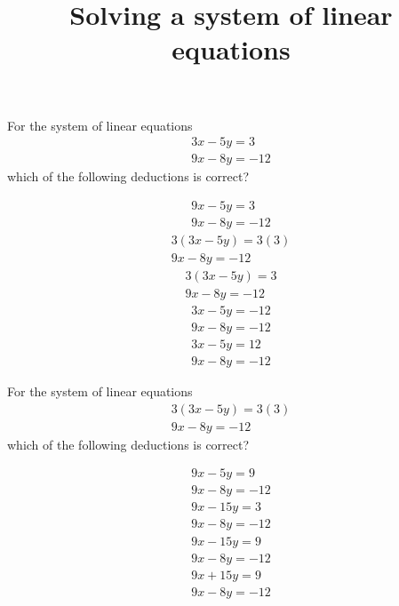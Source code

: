 \documentclass{webquiz}
\title{Solving a system of linear equations}
\begin{document}
\begin{question} %
For the system of linear equations
\begin{gather*} 
3x-5y=3\\
9x-8y=-12
\end{gather*}
which of the following deductions is correct?
\begin{choice}[columns=1] %
\incorrect
\begin{gather*} 
9x-5y=3\\
9x-8y=-12
\end{gather*}
\correct
\begin{gather*} 
3(3x-5y)=3(3)\\
9x-8y=-12
\end{gather*}
\incorrect
\begin{gather*} 
3(3x-5y)=3\\
9x-8y=-12
\end{gather*}
\incorrect
\begin{gather*} 
3x-5y=-12\\
9x-8y=-12
\end{gather*}
\incorrect
\begin{gather*} 
3x-5y=12\\
9x-8y=-12
\end{gather*}
\end{choice}
\end{question}



\begin{question} %
For the system of linear equations
\begin{gather*} 
3(3x-5y)=3(3)\\
9x-8y=-12
\end{gather*}
which of the following deductions is correct?
\begin{choice}[columns=1] %
\incorrect
\begin{gather*} 
9x-5y=9\\
9x-8y=-12
\end{gather*}
\incorrect
\begin{gather*} 
9x-15y=3\\
9x-8y=-12
\end{gather*}
\correct
\begin{gather*} 
9x-15y=9\\
9x-8y=-12
\end{gather*}
\incorrect
\begin{gather*} 
9x+15y=9\\
9x-8y=-12
\end{gather*}
\end{choice}
\end{question}
\end{document}
